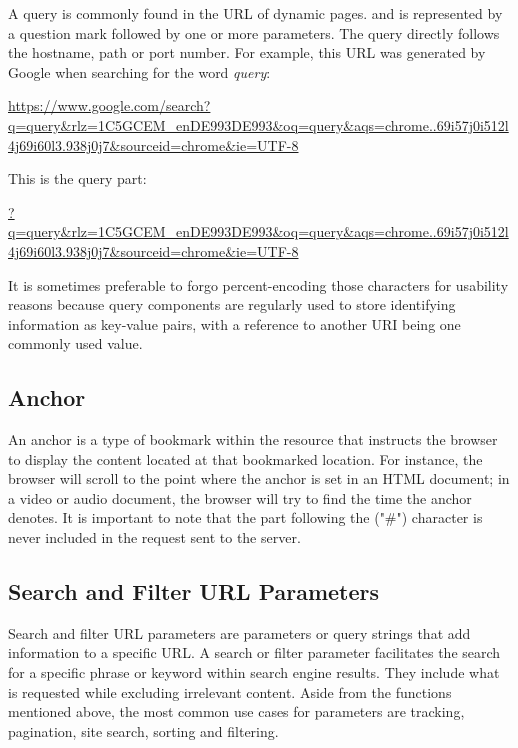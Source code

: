 A query is commonly found in the URL of dynamic pages. and is represented by a question mark followed by one or more parameters. The query directly follows the hostname, path or port number. For example, this URL was generated by Google when searching for the word \emph{query}:

\begin{center}
  \url{https://www.google.com/search?q=query&rlz=1C5GCEM_enDE993DE993&oq=query&aqs=chrome..69i57j0i512l4j69i60l3.938j0j7&sourceid=chrome&ie=UTF-8}
\end{center}

\noindent This is the query part:

\begin{center}
  \url{?q=query&rlz=1C5GCEM_enDE993DE993&oq=query&aqs=chrome..69i57j0i512l4j69i60l3.938j0j7&sourceid=chrome&ie=UTF-8}
\end{center}

It is sometimes preferable to forgo percent-encoding those characters for usability reasons because query components are regularly used to store identifying information as key-value pairs, with a reference to another URI being one commonly used value.

\subsection*{Anchor}
An anchor is a type of bookmark within the resource that instructs the browser to display the content located at that bookmarked location. For instance, the browser will scroll to the point where the anchor is set in an HTML document; in a video or audio document, the browser will try to find the time the anchor denotes. It is important to note that the part following the ("\#") character is never included in the request sent to the server.

\subsection{Search and Filter URL Parameters}
Search and filter URL parameters are parameters or query strings that add information to a specific URL. A search or filter parameter facilitates the search for a specific phrase or keyword within search engine results. They include what is requested while excluding irrelevant content. Aside from the functions mentioned above, the most common use cases for parameters are tracking, pagination, site search, sorting and filtering.


